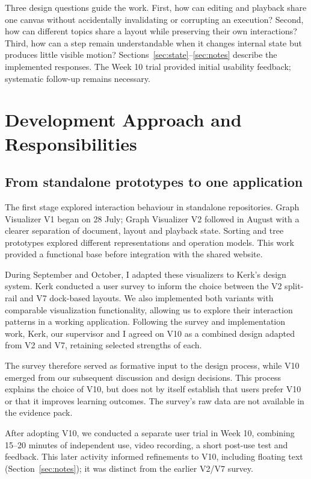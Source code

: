 \documentclass[11pt,a4paper]{article}
\newcommand{\page}{\par\vspace{8pt}}
\begin{document}
Three design questions guide the work. First, how can editing and playback share one canvas without accidentally invalidating or corrupting an execution? Second, how can different topics share a layout while preserving their own interactions? Third, how can a step remain understandable when it changes internal state but produces little visible motion? Sections~\ref{sec:state}--\ref{sec:notes} describe the implemented responses. The Week 10 trial provided initial usability feedback; systematic follow-up remains necessary.

\page
\section{Development Approach and Responsibilities}\label{sec:approach}
\subsection{From standalone prototypes to one application}
The first stage explored interaction behaviour in standalone repositories. Graph Visualizer V1 began on 28 July; Graph Visualizer V2 followed in August with a clearer separation of document, layout and playback state. Sorting and tree prototypes explored different representations and operation models. This work provided a functional base before integration with the shared website.

During September and October, I adapted these visualizers to Kerk's design system. Kerk conducted a user survey to inform the choice between the V2 split-rail and V7 dock-based layouts. We also implemented both variants with comparable visualization functionality, allowing us to explore their interaction patterns in a working application. Following the survey and implementation work, Kerk, our supervisor and I agreed on V10 as a combined design adapted from V2 and V7, retaining selected strengths of each.

The survey therefore served as formative input to the design process, while V10 emerged from our subsequent discussion and design decisions. This process explains the choice of V10, but does not by itself establish that users prefer V10 or that it improves learning outcomes. The survey's raw data are not available in the evidence pack.

After adopting V10, we conducted a separate user trial in Week 10, combining 15--20 minutes of independent use, video recording, a short post-use test and feedback. This later activity informed refinements to V10, including floating text (Section~\ref{sec:notes}); it was distinct from the earlier V2/V7 survey.
\end{document}
